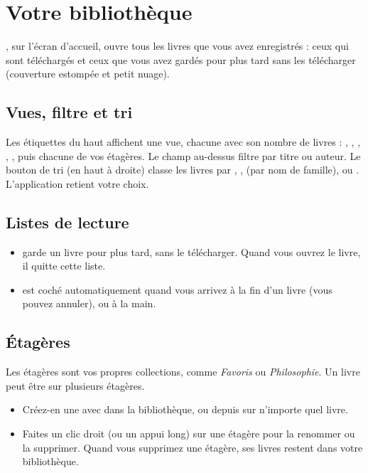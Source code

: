 \documentclass[11pt]{article}
\begin{document}
\section{Votre bibliothèque}\label{sec:library}

, sur l’écran d’accueil, ouvre tous les livres que vous avez
enregistrés : ceux qui sont téléchargés et ceux que vous avez gardés pour plus tard sans les
télécharger (couverture estompée et petit nuage).


\subsection{Vues, filtre et tri}
Les étiquettes du haut affichent une vue, chacune avec son nombre de livres : ,
, , , , puis chacune de vos étagères. Le champ
au-dessus filtre par titre ou auteur. Le bouton de tri (en haut à droite) classe les livres par
, ,  (par nom de famille),  ou
. L’application retient votre choix.

\subsection{Listes de lecture}
\begin{itemize}
  \item {} garde un livre pour plus tard, sans le télécharger. Quand vous ouvrez le livre,
        il quitte cette liste.
  \item {} est coché automatiquement quand vous arrivez à la fin d’un livre (vous pouvez
        annuler), ou à la main.
\end{itemize}

\subsection{Étagères}
Les étagères sont vos propres collections, comme \emph{Favoris} ou \emph{Philosophie}. Un livre
peut être sur plusieurs étagères.
\begin{itemize}
  \item Créez-en une avec  dans la bibliothèque, ou depuis
         sur n’importe quel livre.
  \item Faites un clic droit (ou un appui long) sur une étagère pour la renommer ou la supprimer.
        Quand vous supprimez une étagère, ses livres restent dans votre bibliothèque.
\end{itemize}
\end{document}
